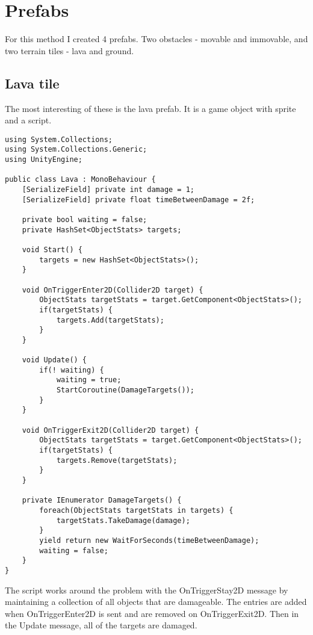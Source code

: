 \documentclass[11pt]{article}
\begin{document}
\section{Prefabs}
\label{sec:orgf3e9f80}
For this method I created 4 prefabs. Two obstacles - movable and immovable, and two terrain tiles - lava and ground.

\subsection{Lava tile}
\label{sec:org2138c66}
The most interesting of these is the lava prefab. It is a game object with sprite and a script.

\begin{verbatim}
using System.Collections;
using System.Collections.Generic;
using UnityEngine;

public class Lava : MonoBehaviour {
    [SerializeField] private int damage = 1;
    [SerializeField] private float timeBetweenDamage = 2f;

    private bool waiting = false;
    private HashSet<ObjectStats> targets;

    void Start() {
        targets = new HashSet<ObjectStats>();
    }

    void OnTriggerEnter2D(Collider2D target) {
        ObjectStats targetStats = target.GetComponent<ObjectStats>();
        if(targetStats) {
            targets.Add(targetStats);
        }
    }

    void Update() {
        if(! waiting) {
            waiting = true;
            StartCoroutine(DamageTargets());
        }
    }

    void OnTriggerExit2D(Collider2D target) {
        ObjectStats targetStats = target.GetComponent<ObjectStats>();
        if(targetStats) {
            targets.Remove(targetStats);
        }
    }

    private IEnumerator DamageTargets() {
        foreach(ObjectStats targetStats in targets) {
            targetStats.TakeDamage(damage);
        }
        yield return new WaitForSeconds(timeBetweenDamage);
        waiting = false;
    }
}
\end{verbatim}

The script works around the problem with the OnTriggerStay2D message by maintaining a collection of all objects that are damageable. The entries are added when OnTriggerEnter2D is sent and are removed on OnTriggerExit2D. Then in the Update message, all of the targets are damaged.
\end{document}
